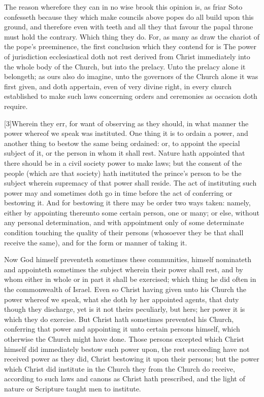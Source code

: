 The reason wherefore they can in no wise brook this opinion is, as friar Soto confesseth because they which make councils above popes do all build upon this ground, and therefore even with teeth and all they that favour the papal throne must hold the contrary. Which thing they do. For, as many as draw the chariot of the pope’s preeminence, the first conclusion which they contend for is The power of jurisdiction ecclesiastical doth not rest derived from Christ immediately into the whole body of the Church, but into the prelacy. Unto the prelacy alone it belongeth; as ours also do imagine, unto the governors of the Church alone it was first given, and doth appertain, even of very divine right, in every church established to make such laws concerning orders and ceremonies as occasion doth require.

[3]Wherein they err, for want of observing as they should, in what manner the power whereof we speak was instituted. One thing it is to ordain a power, and another thing to bestow the same being ordained: or, to appoint the special subject of it, or the person in whom it shall rest. Nature hath appointed that there should be in a civil society power to make laws; but the consent of the people (which are that society) hath instituted the prince’s person to be the subject wherein supremacy of that power shall reside. The act of instituting  such power may and sometimes doth go in time before the act of conferring or bestowing it. And for bestowing it there may be order two ways taken: namely, either by appointing thereunto some certain person, one or many; or else, without any personal determination, and with appointment only of some determinate condition touching the quality of their persons (whosoever they be that shall receive the same), and for the form or manner of taking it.

Now God himself preventeth sometimes these communities, himself nominateth and appointeth sometimes the subject wherein their power shall rest, and by whom either in whole or in part it shall be exercised; which thing he did often in the commonwealth of Israel. Even so Christ having given unto his Church the power whereof we speak, what she doth by her appointed agents, that duty though they discharge, yet is it not theirs peculiarly, but hers; her power it is which they do exercise. But Christ hath sometimes prevented his Church, conferring that power and appointing it unto certain persons himself, which otherwise the Church might have done. Those persons excepted which Christ himself did immediately bestow such power upon, the rest succeeding have not received power as they did, Christ bestowing it upon their persons; but the power which Christ did institute in the Church they from the Church do receive, according to such laws and canons as Christ hath prescribed, and the light of nature or Scripture taught men to institute.


